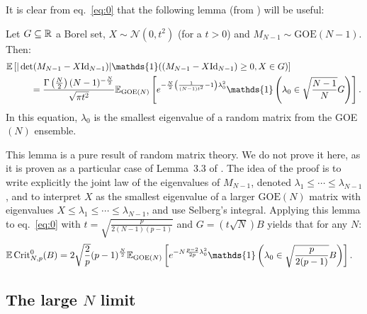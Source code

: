 \documentclass[amsmath,amssymb,nofootinbib,prd]{article}
\begin{document}
	It is clear from eq.~\eqref{eq:0} that the following lemma (from \cite{auffinger2013random}) will be useful:
	\begin{lemma}\label{lemma:simplification} Let $G \subseteq \mathbb{R}$ a Borel set, $X \sim \mathcal{N}(0,t^2)$ (for a $t > 0$) and $M_{N-1} \sim \mathrm{GOE}(N-1)$. Then:
	\begin{align}
	\EE &\left[|\det (M_{N-1} - X \mathrm{Id}_{N-1})| \mathds{1}( (M_{N-1} - X \mathrm{Id}_{N-1}) \geq 0, X \in G)\right] \nonumber \\
	&\qquad = \frac{\Gamma\left(\frac{N}{2}\right)(N-1)^{-\frac{N}{2}}}{\sqrt{\pi t^2}} \EE_{\mathrm{GOE}(N)} \left[e^{-\frac{N}{2}\left(\frac{1}{(N-1)t^2} - 1\right) \lambda_0^2} \mathds{1} \left(\lambda_0 \in \sqrt{\frac{N-1}{N}} G\right)\right].
	\end{align}
	In this equation, $\lambda_0$ is the smallest eigenvalue of a random matrix from the GOE$(N)$ ensemble. 
	\end{lemma}
	This lemma is a pure result of random matrix theory.
	We do not prove it here, as it is proven as a particular case of Lemma~3.3 of \cite{auffinger2013random}.
	The idea of the proof is to write explicitly the joint law of the eigenvalues of $M_{N-1}$, denoted $\lambda_1 \leq \cdots \leq \lambda_{N-1}$, and to interpret $X$ as the smallest eigenvalue of a larger $\mathrm{GOE}(N)$ matrix with eigenvalues $X \leq \lambda_1 \leq \cdots \leq \lambda_{N-1}$, and use Selberg's integral. 
	Applying this lemma to eq.~\eqref{eq:0} with $t = \sqrt{\frac{p}{2 (N-1)(p-1)}}$ and  $G = (t\sqrt{N}) B$ yields that for any $N$:
	\begin{align}\label{eq:1}
	\EE \, \mathrm{Crit}_{N,p}^0(B) &= 2 \sqrt{\frac{2}{p}} (p-1)^{\frac{N}{2}} \EE_{\mathrm{GOE}(N)} \left[e^{-N \frac{p-2}{2p} \lambda_0^2} \mathds{1} \left(\lambda_0 \in  \sqrt{\frac{p}{2(p-1)}} B\right)\right].
\end{align}		
	
	\subsection{The large \texorpdfstring{$N$}{N} limit}
	
\end{document}
